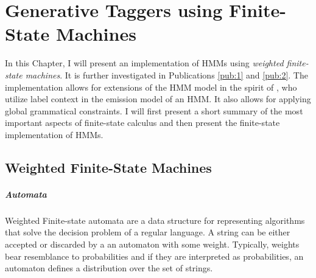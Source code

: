 \chapter{Generative Taggers using Finite-State Machines}
\label{chap:fsm}
In this Chapter, I will present an implementation of HMMs using {\it
  weighted finite-state machines}. It is further investigated in
Publications \ref{pub:1} and \ref{pub:2}. The implementation allows
for extensions of the HMM model in the spirit of \cite{Halacsy2007},
who utilize label context in the emission model of an HMM. It also
allows for applying global grammatical constraints. I will first
present a short summary of the most important aspects of finite-state
calculus and then present the finite-state implementation of HMMs.

\section{Weighted Finite-State Machines}

\paragraph{Automata} Weighted Finite-state automata are a data
structure for representing algorithms that solve the decision problem
of a regular language. A string can be either accepted or discarded
by a an automaton with some weight. Typically, weights bear
resemblance to probabilities and if they are interpreted as
probabilities, an automaton defines a distribution over the set of
strings. 

